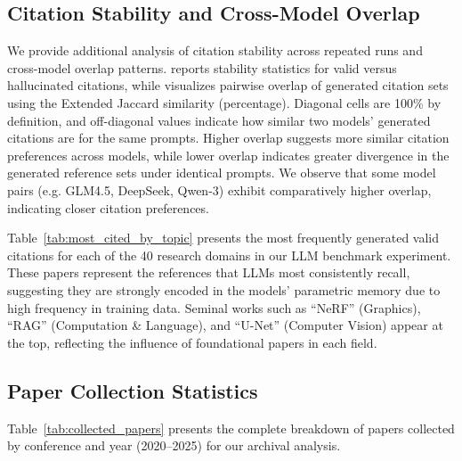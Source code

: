 





\subsection{Citation Stability and Cross-Model Overlap}



\label{app:stability_overlap}

We provide additional analysis of citation stability across repeated runs and cross-model overlap patterns.
 reports stability statistics for valid versus hallucinated citations,  while  visualizes pairwise overlap of generated citation sets using the Extended Jaccard similarity (percentage).
Diagonal cells are 100\% by definition, and off-diagonal values indicate how similar two models' generated citations are for the same prompts.
Higher overlap suggests more similar citation preferences across models, while lower overlap indicates greater divergence in the generated reference sets under identical prompts.
We observe that some model pairs (e.g. GLM4.5, DeepSeek, Qwen-3) exhibit comparatively higher overlap, indicating closer citation preferences.

Table~\ref{tab:most_cited_by_topic} presents the most frequently generated valid citations for each of the 40 research domains in our LLM benchmark experiment.
These papers represent the references that LLMs most consistently recall, suggesting they are strongly encoded in the models' parametric memory due to high frequency in training data.
Seminal works such as ``NeRF'' (Graphics), ``RAG'' (Computation \& Language), and ``U-Net'' (Computer Vision) appear at the top, reflecting the influence of foundational papers in each field.








\subsection{Paper Collection Statistics}
\label{app:collected_papers}




Table~\ref{tab:collected_papers} presents the complete breakdown of papers collected by conference and year (2020--2025) for our archival analysis.

